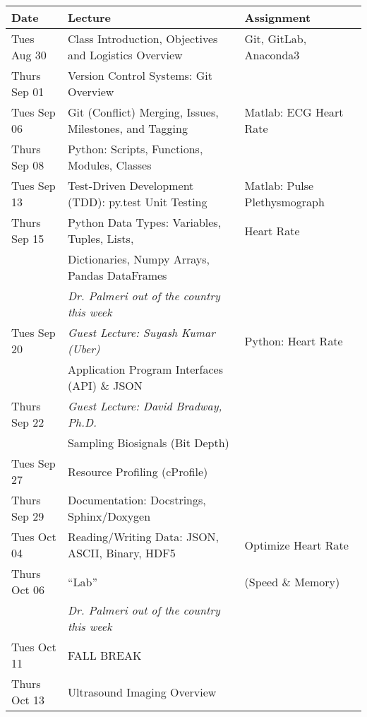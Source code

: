 \begin{longtable}[c]{|l|l|l|}

    \hline 
    
    \textbf{Date} & \textbf{Lecture} & \textbf{Assignment}\\

    \hline

    Tues Aug 30     & Class Introduction, Objectives and Logistics Overview & Git, GitLab, Anaconda3 \\
    Thurs Sep 01    & Version Control Systems: Git Overview & \\
    \hline
    Tues Sep 06     & Git (Conflict) Merging, Issues, Milestones, and Tagging & Matlab: ECG Heart Rate \\
    Thurs Sep 08    & Python: Scripts, Functions, Modules, Classes & \\
    \hline
    Tues Sep 13     & Test-Driven Development (TDD): py.test Unit Testing & Matlab: Pulse Plethysmograph \\
    Thurs Sep 15    & Python Data Types: Variables, Tuples, Lists, & Heart Rate \\
                    & Dictionaries, Numpy Arrays, Pandas DataFrames & \\
    \hline
                    & \emph{Dr. Palmeri out of the country this week} & \\
    Tues Sep 20     & \emph{Guest Lecture: Suyash Kumar (Uber)} & Python: Heart Rate \\
                    & Application Program Interfaces (API) \& JSON & \\
    Thurs Sep 22    & \emph{Guest Lecture: David Bradway, Ph.D.} & \\
                    & Sampling Biosignals (Bit Depth) & \\
    \hline
    Tues Sep 27    & Resource Profiling (cProfile) & \\
    Thurs Sep 29    & Documentation: Docstrings, Sphinx/Doxygen & \\
    \hline
    Tues Oct 04     & Reading/Writing Data: JSON, ASCII, Binary, HDF5 & Optimize Heart Rate \\
    Thurs Oct 06    & ``Lab'' & (Speed \& Memory) \\
    \hline
                    & \emph{Dr. Palmeri out of the country this week} & \\
    Tues Oct 11     & FALL BREAK & \\
    Thurs Oct 13    & Ultrasound Imaging Overview & \\

\end{longtable}
